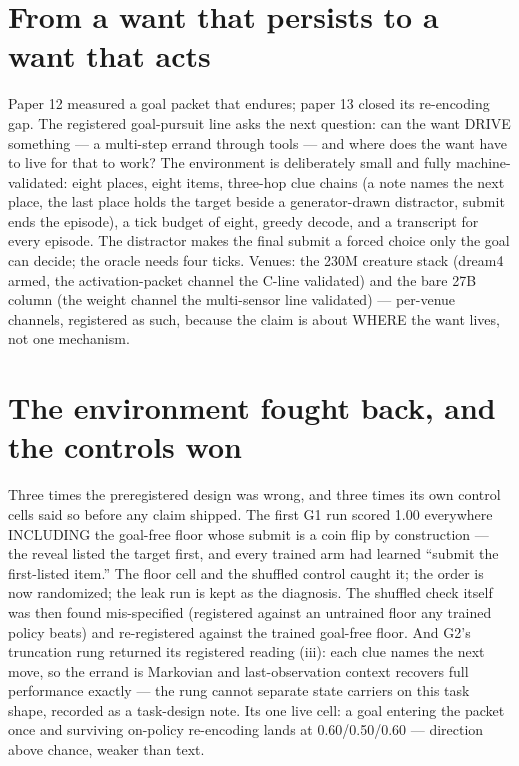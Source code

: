 \documentclass[11pt]{article}
\begin{document}
\section{From a want that persists to a want that acts}

Paper 12 measured a goal packet that endures; paper 13 closed its
re-encoding gap. The registered goal-pursuit line asks the next
question: can the want DRIVE something --- a multi-step errand through
tools --- and where does the want have to live for that to work? The
environment is deliberately small and fully machine-validated: eight
places, eight items, three-hop clue chains (a note names the next
place, the last place holds the target beside a generator-drawn
distractor, submit ends the episode), a tick budget of eight, greedy
decode, and a transcript for every episode. The distractor makes the
final submit a forced choice only the goal can decide; the oracle needs
four ticks. Venues: the 230M creature stack (dream4 armed, the
activation-packet channel the C-line validated) and the bare 27B column
(the weight channel the multi-sensor line validated) --- per-venue
channels, registered as such, because the claim is about WHERE the want
lives, not one mechanism.

\section{The environment fought back, and the controls won}

Three times the preregistered design was wrong, and three times its own
control cells said so before any claim shipped. The first G1 run scored
1.00 everywhere INCLUDING the goal-free floor whose submit is a coin
flip by construction --- the reveal listed the target first, and every
trained arm had learned ``submit the first-listed item.'' The floor
cell and the shuffled control caught it; the order is now randomized;
the leak run is kept as the diagnosis. The shuffled check itself was
then found mis-specified (registered against an untrained floor any
trained policy beats) and re-registered against the trained goal-free
floor. And G2's truncation rung returned its registered reading (iii):
each clue names the next move, so the errand is Markovian and
last-observation context recovers full performance exactly --- the rung
cannot separate state carriers on this task shape, recorded as a
task-design note. Its one live cell: a goal entering the packet once
and surviving on-policy re-encoding lands at 0.60/0.50/0.60 ---
direction above chance, weaker than text.
\end{document}
